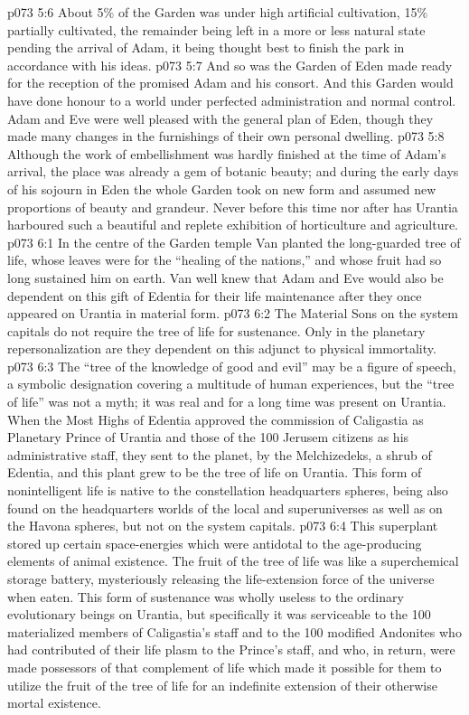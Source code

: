 \vs p073 5:6 About 5\% of the Garden was under high artificial cultivation, 15\% partially cultivated, the remainder being left in a more or less natural state pending the arrival of Adam, it being thought best to finish the park in accordance with his ideas.
\vs p073 5:7 And so was the Garden of Eden made ready for the reception of the promised Adam and his consort. And this Garden would have done honour to a world under perfected administration and normal control. Adam and Eve were well pleased with the general plan of Eden, though they made many changes in the furnishings of their own personal dwelling.
\vs p073 5:8 Although the work of embellishment was hardly finished at the time of Adam’s arrival, the place was already a gem of botanic beauty; and during the early days of his sojourn in Eden the whole Garden took on new form and assumed new proportions of beauty and grandeur. Never before this time nor after has Urantia harboured such a beautiful and replete exhibition of horticulture and agriculture.
\vs p073 6:1 In the centre of the Garden temple Van planted the long\hyp{}guarded tree of life, whose leaves were for the “healing of the nations,” and whose fruit had so long sustained him on earth. Van well knew that Adam and Eve would also be dependent on this gift of Edentia for their life maintenance after they once appeared on Urantia in material form.
\vs p073 6:2 The Material Sons on the system capitals do not require the tree of life for sustenance. Only in the planetary repersonalization are they dependent on this adjunct to physical immortality.
\vs p073 6:3 \pc The “tree of the knowledge of good and evil” may be a figure of speech, a symbolic designation covering a multitude of human experiences, but the “tree of life” was not a myth; it was real and for a long time was present on Urantia. When the Most Highs of Edentia approved the commission of Caligastia as Planetary Prince of Urantia and those of the 100 Jerusem citizens as his administrative staff, they sent to the planet, by the Melchizedeks, a shrub of Edentia, and this plant grew to be the tree of life on Urantia. This form of nonintelligent life is native to the constellation headquarters spheres, being also found on the headquarters worlds of the local and superuniverses as well as on the Havona spheres, but not on the system capitals.
\vs p073 6:4 This superplant stored up certain space\hyp{}energies which were antidotal to the age\hyp{}producing elements of animal existence. The fruit of the tree of life was like a superchemical storage battery, mysteriously releasing the life\hyp{}extension force of the universe when eaten. This form of sustenance was wholly useless to the ordinary evolutionary beings on Urantia, but specifically it was serviceable to the 100 materialized members of Caligastia’s staff and to the 100 modified Andonites who had contributed of their life plasm to the Prince’s staff, and who, in return, were made possessors of that complement of life which made it possible for them to utilize the fruit of the tree of life for an indefinite extension of their otherwise mortal existence.
